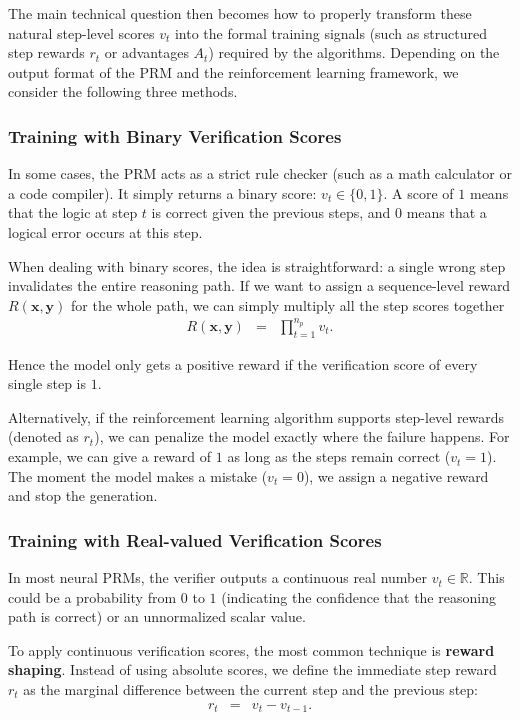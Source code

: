 The main technical question then becomes how to properly transform these natural step-level scores $v_t$ into the formal training signals (such as structured step rewards $r_t$ or advantages $A_t$) required by the algorithms. Depending on the output format of the PRM and the reinforcement learning framework, we consider the following three methods.

\subsubsection{Training with Binary Verification Scores}

In some cases, the PRM acts as a strict rule checker (such as a math calculator or a code compiler). It simply returns a binary score: $v_t \in \{0, 1\}$. A score of $1$ means that the logic at step $t$ is correct given the previous steps, and $0$ means that a logical error occurs at this step.

When dealing with binary scores, the idea is straightforward: a single wrong step invalidates the entire reasoning path. If we want to assign a sequence-level reward $R(\mathbf{x}, \mathbf{y})$ for the whole path, we can simply multiply all the step scores together
\begin{eqnarray}
R(\mathbf{x}, \mathbf{y}) & = & \prod_{t=1}^{n_p} v_t.
\end{eqnarray}

\noindent Hence the model only gets a positive reward if the verification score of every single step is $1$.

Alternatively, if the reinforcement learning algorithm supports step-level rewards (denoted as $r_t$), we can penalize the model exactly where the failure happens. For example, we can give a reward of $1$ as long as the steps remain correct ($v_t = 1$). The moment the model makes a mistake ($v_t = 0$), we assign a negative reward and stop the generation.


\subsubsection{Training with Real-valued Verification Scores}

In most neural PRMs, the verifier outputs a continuous real number $v_t \in \mathbb{R}$. This could be a probability from $0$ to $1$ (indicating the confidence that the reasoning path is correct) or an unnormalized scalar value.

To apply continuous verification scores, the most common technique is \textbf{reward shaping}. Instead of using absolute scores, we define the immediate step reward $r_t$ as the marginal difference between the current step and the previous step:
\begin{eqnarray}
r_t & = & v_t - v_{t-1}.
\end{eqnarray}

